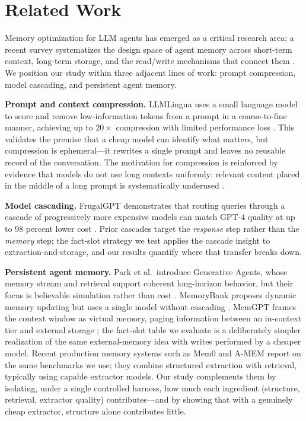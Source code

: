 \documentclass[conference]{IEEEtran}
\begin{document}
\section{Related Work}

Memory optimization for LLM agents has emerged as a critical research area; a recent survey systematizes the design space of agent memory across short-term context, long-term storage, and the read/write mechanisms that connect them \cite{zhang2024memorysurvey}. We position our study within three adjacent lines of work: prompt compression, model cascading, and persistent agent memory.

\textbf{Prompt and context compression.} LLMLingua uses a small language model to score and remove low-information tokens from a prompt in a coarse-to-fine manner, achieving up to $20\times$ compression with limited performance loss \cite{jiang2023llmlingua}. This validates the premise that a cheap model can identify what matters, but compression is ephemeral---it rewrites a single prompt and leaves no reusable record of the conversation. The motivation for compression is reinforced by evidence that models do not use long contexts uniformly: relevant content placed in the middle of a long prompt is systematically underused \cite{nfliu2023lost}.

\textbf{Model cascading.} FrugalGPT demonstrates that routing queries through a cascade of progressively more expensive models can match GPT-4 quality at up to 98 percent lower cost \cite{chen2023frugalgpt}. Prior cascades target the \emph{response} step rather than the \emph{memory} step; the fact-slot strategy we test applies the cascade insight to extraction-and-storage, and our results quantify where that transfer breaks down.

\textbf{Persistent agent memory.} Park et al.\ introduce Generative Agents, whose memory stream and retrieval support coherent long-horizon behavior, but their focus is believable simulation rather than cost \cite{park2023generative}. MemoryBank proposes dynamic memory updating but uses a single model without cascading \cite{zhong2024memorybank}. MemGPT frames the context window as virtual memory, paging information between an in-context tier and external storage \cite{packer2023memgpt}; the fact-slot table we evaluate is a deliberately simpler realization of the same external-memory idea with writes performed by a cheaper model. Recent production memory systems such as Mem0 \cite{chhikara2025mem0} and A-MEM \cite{xu2025amem} report on the same benchmarks we use; they combine structured extraction with retrieval, typically using capable extractor models. Our study complements them by isolating, under a single controlled harness, how much each ingredient (structure, retrieval, extractor quality) contributes---and by showing that with a genuinely cheap extractor, structure alone contributes little.
\end{document}
